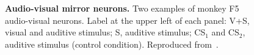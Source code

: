 \begin{figure}[htbp]
	\centering

	\caption[Audio-visual mirror neurons]{\textbf{Audio-visual mirror neurons.}
	Two examples of monkey F5 audio-visual neurons. 
	Label at the upper left of each panel: V+S, visual and auditive stimulus; 
	S, auditive stimulus; CS$_{1}$ and CS$_{2}$, auditive stimulus
	(control condition).
	Reproduced from~\citet{kohler.etal:2002}.}
	\label{fig:actions:understanding:kohler:a}
\end{figure}
